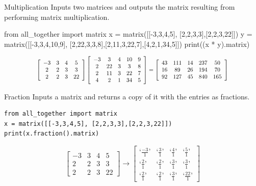 \documentclass{beamer}
\begin{document}
\begin{frame}[fragile = singleslide]{Multiplication}
Inputs two matrices and outputs the matrix resulting from performing matrix multiplication.
\begin{verbnobox}[\fontsize{8pt}{8pt}\selectfont]
from all_together import matrix
x = matrix([[-3,3,4,5], [2,2,3,3],[2,2,3,22]])
y = matrix([[-3,3,4,10,9], [2,22,3,3,8],[2,11,3,22,7],[4,2,1,34,5]])
print((x * y).matrix) 
\end{verbnobox}
\begin{equation*}
\scalebox{0.8}{$
\left[
    \begin{array}{cccc}
        -3 &3&4&5  \\
         2&2&3&3\\
         2&2&3&22
    \end{array}
\right]
    \left[
    \begin{array}{ccccc}
        -3 &3&4&10&9  \\
         2&22&3&3&8\\
         2&11&3&22&7\\
         4&2&1&34&5
    \end{array}
    \right] 
    =
    \left[
    \begin{array}{ccccc}
        43 &111&14&237&50  \\
         16&89&26&194&70\\
         92&127&45&840&165
    \end{array}
    \right]
$}
\end{equation*}



\end{frame}

\begin{frame}[fragile = singleslide]{Fraction}
Inputs a matrix and returns a copy of it with the entries as fractions.
\begin{verbatim}
from all_together import matrix    
x = matrix([[-3,3,4,5], [2,2,3,3],[2,2,3,22]])
print(x.fraction().matrix) 
\end{verbatim}
\begin{equation*}
    \left[ \begin{array}{cccc} -3&3&4&5 \\ 2&2&3&3 \\ 2&2&3&22 \end{array}\right]
    \rightarrow
    \left[
    \begin{array}{cccc}
        \text{`}\frac{-3}{1}\text{'} &\text{`}\frac{3}{1}\text{'}&\text{`}\frac{4}{1}\text{'}&\text{`}\frac{5}{1}\text{'}  \\
         \text{`}\frac{2}{1}\text{'}&\text{`}\frac{2}{1}\text{'}&\text{`}\frac{3}{1}\text{'}&\text{`}\frac{3}{1}\text{'}\\
         \text{`}\frac{2}{1}\text{'}&\text{`}\frac{2}{1}\text{'}&\text{`}\frac{3}{1}\text{'}&\text{`}\frac{22}{1}\text{'}
    \end{array}
    \right]
\end{equation*}

\end{frame}
\end{document}
